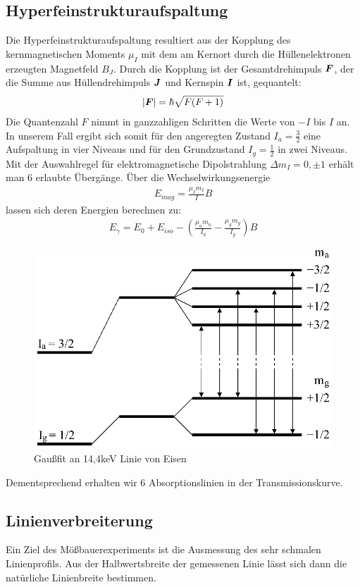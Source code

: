 \documentclass[12pt]{article}
\renewcommand*\vec[1]{{\mbox{\boldmath\ensuremath{#1}}}}
\begin{document}
\subsection{Hyperfeinstrukturaufspaltung}
Die Hyperfeinstrukturaufspaltung resultiert aus der Kopplung des kernmagnetischen Moments $\mu_I$ mit dem am Kernort durch die Hüllenelektronen erzeugten Magnetfeld $B_J$.
Durch die Kopplung ist der Gesamtdrehimpuls $\vec{F}$, der die Summe aus Hüllendrehimpuls $\vec{J}$ und Kernspin $\vec{I}$ ist, gequantelt:
\begin{align}
 \left|\vec{F}\right| = \hbar \sqrt{F(F+1)}
\end{align}
Die Quantenzahl $F$ nimmt in ganzzahligen Schritten die Werte von $-I$ bis $I$ an.
In unserem Fall ergibt sich somit für den angeregten Zustand $I_a = \frac{3}{2}$ eine Aufspaltung in vier Niveaus und für den Grundzustand $I_g = \frac{1}{2}$ in zwei Niveaus.
Mit der Auswahlregel für elektromagnetische Dipolstrahlung $\Delta m_I = 0, \pm 1$ erhält man $6$ erlaubte Übergänge. Über die Wechselwirkungsenergie
\begin{align}
 E_{mag} = \frac{\mu_I m_I}{I} B
\end{align}
lassen sich deren Energien berechnen zu:
\begin{align}
 E_\gamma = E_0 + E_{iso} - \left(\frac{\mu_a m_a}{I_a} - \frac{\mu_g m_g}{I_g} \right) B
\label{hfs}
\end{align}
\begin{figure}[H]
 \includegraphics[width=0.9\linewidth]{pictures/termshema_eisen.eps}
 \caption{Gaußfit an 14,4keV Linie von Eisen}
\label{eisen_term}
\end{figure}
Dementsprechend erhalten wir 6 Absorptionslinien in der Transmissionskurve.
\subsection{Linienverbreiterung}
\label{linienverbreiterung}
Ein Ziel des Mößbauerexperiments ist die Ausmessung des sehr schmalen Linienprofils. Aus der Halbwertsbreite der gemessenen Linie lässt sich dann die natürliche Linienbreite bestimmen.
\end{document}

